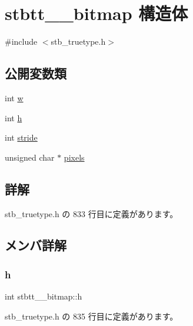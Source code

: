 \hypertarget{structstbtt____bitmap}{}\section{stbtt\+\_\+\+\_\+bitmap 構造体}
\label{structstbtt____bitmap}


{\ttfamily \#include $<$stb\+\_\+truetype.\+h$>$}

\subsection*{公開変数類}
\begin{DoxyCompactItemize}
\item 
int \mbox{\hyperlink{structstbtt____bitmap_afbd607426f0a457b1a871ed902eeb926}{w}}
\item 
int \mbox{\hyperlink{structstbtt____bitmap_a2afc802e26e9f1dda897ac16ecfff10e}{h}}
\item 
int \mbox{\hyperlink{structstbtt____bitmap_a48ee6b550ee4f1d85bfc32c62c0e9a98}{stride}}
\item 
unsigned char $\ast$ \mbox{\hyperlink{structstbtt____bitmap_ae6be77625faf55b110eaaffde5c7733c}{pixels}}
\end{DoxyCompactItemize}


\subsection{詳解}


 stb\+\_\+truetype.\+h の 833 行目に定義があります。



\subsection{メンバ詳解}
\mbox{\label{structstbtt____bitmap_a2afc802e26e9f1dda897ac16ecfff10e}} 
\subsubsection{\texorpdfstring{h}{h}}
{\footnotesize\ttfamily int stbtt\+\_\+\+\_\+bitmap\+::h}



 stb\+\_\+truetype.\+h の 835 行目に定義があります。

